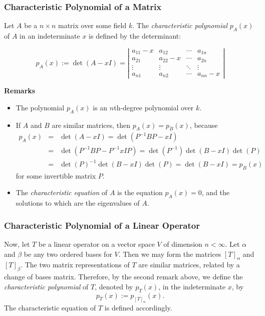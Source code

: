 \documentclass[12pt]{article}
\begin{document}
\subsubsection*{Characteristic Polynomial of a Matrix}

Let $A$ be a $n \times n$ matrix over some field $k$.  The \emph{characteristic polynomial} $p_A(x)$ of $A$ in an indeterminate $x$ is defined by the determinant:

$$ p_A(x):=\det(A-x I) =
\left|\begin{matrix}
a_{11}-x & a_{12} & \cdots & a_{1n} \\
a_{21} & a_{22}-x & \cdots & a_{2n} \\
\vdots & \vdots & \ddots & \vdots \\
a_{n1} & a_{n2} & \cdots & a_{nn}-x
\end{matrix} \right|$$

\textbf{Remarks}
\begin{itemize}
\item
The polynomial $p_A(x)$ is an $n$th-degree polynomial over $k$.
\item
If $A$ and $B$ are similar matrices, then $p_A(x)=p_B(x)$, because 
\begin{eqnarray*}
p_A(x) &=& \det(A-xI) = \det(P^{-1}BP-xI) \\ &=& \det(P^{-1}BP-P^{-1}xIP) = \det(P^{-1})\det(B-xI)\det(P) \\ &=& \det(P)^{-1}\det(B-xI)\det(P)=\det(B-xI) = p_B(x)
\end{eqnarray*}
for some invertible matrix $P$.
\item
The \emph{characteristic equation} of $A$ is the equation $p_A(x)=0$, and the solutions to which are the eigenvalues of $A$.
\end{itemize}

\subsubsection*{Characteristic Polynomial of a Linear Operator}

Now, let $T$ be a linear operator on a vector space $V$ of dimension $n<\infty$.  Let $\alpha$ and $\beta$ be any two ordered bases for $V$.  Then we may form the matrices $[T]_{\alpha}$ and $[T]_{\beta}$.  The two matrix representations of $T$ are similar matrices, related by a change of bases matrix.  Therefore, by the second remark above, we define the \emph{characteristic polynomial} of $T$, denoted by $p_T(x)$, in the indeterminate $x$, by $$p_T(x):=p_{[T]_{\alpha}}(x).$$  The characteristic equation of $T$ is defined accordingly.

\end{document}
